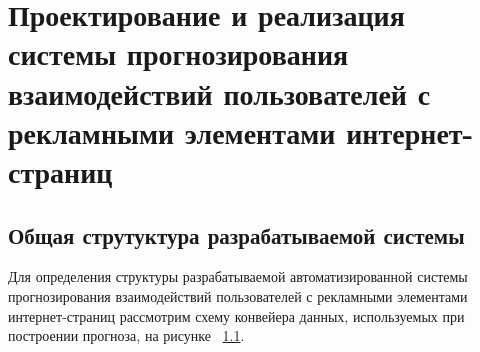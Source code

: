 \section{Проектирование и реализация системы прогнозирования взаимодействий пользователей с рекламными элементами \mbox{интернет-страниц}}
\subsection{Общая струтуктура разрабатываемой системы}

Для определения структуры разрабатываемой автоматизированной системы прогнозирования взаимодействий пользователей
с рекламными элементами интернет-страниц рассмотрим схему конвейера данных, используемых при построении прогноза,
на рисунке ~\ref{}.
% 
